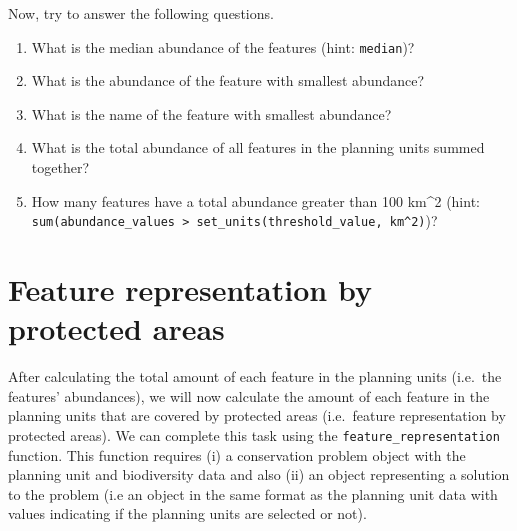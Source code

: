 \documentclass[
  12pt,
]{book}
\makeatletter
\newenvironment{Shaded}{\begin{snugshade}}{\end{snugshade}}
\newcommand{\CommentTok}[1]{\textcolor[rgb]{0.56,0.35,0.01}{\textit{#1}}}
\newcommand{\FunctionTok}[1]{\textcolor[rgb]{0.00,0.00,0.00}{#1}}
\newcommand{\NormalTok}[1]{#1}
\newcommand{\OtherTok}[1]{\textcolor[rgb]{0.56,0.35,0.01}{#1}}
\newcommand{\SpecialCharTok}[1]{\textcolor[rgb]{0.00,0.00,0.00}{#1}}
\newcommand{\StringTok}[1]{\textcolor[rgb]{0.31,0.60,0.02}{#1}}
\providecommand{\tightlist}{%
  \setlength{\itemsep}{0pt}\setlength{\parskip}{0pt}}
\newenvironment{kframe}{%
\medskip{}
\setlength{\fboxsep}{.8em}
 \def\at@end@of@kframe{}%
 \ifinner\ifhmode%
  \def\at@end@of@kframe{\end{minipage}}%
  \begin{minipage}{\columnwidth}%
 \fi\fi%
 \def\FrameCommand##1{\hskip\@totalleftmargin \hskip-\fboxsep
 \colorbox{shadecolor}{##1}\hskip-\fboxsep
     \hskip-\linewidth \hskip-\@totalleftmargin \hskip\columnwidth}%
 \MakeFramed {\advance\hsize-\width
   \@totalleftmargin\z@ \linewidth\hsize
   \@setminipage}}%
 {\par\unskip\endMakeFramed%
 \at@end@of@kframe}
\newenvironment{rmdblock}[1]
  {
  \begin{itemize}
  \renewcommand{\labelitemi}{
    \raisebox{-.7\height}[0pt][0pt]{
      {\setkeys{Gin}{width=3em,keepaspectratio}\texttt{[image: images/\#1]}}
    }
  }
  \setlength{\fboxsep}{1em}
  \begin{kframe}
  \item
  }
  {
  \end{kframe}
  \end{itemize}
  }
\newenvironment{rmdquestion}
  {\begin{rmdblock}{question}}
  {\end{rmdblock}}
\makeatother
\begin{document}
Now, try to answer the following questions.

\begin{rmdquestion}
\begin{enumerate}
\def\labelenumi{\arabic{enumi}.}
\tightlist
\item
  What is the median abundance of the features (hint: \texttt{median})?
\item
  What is the abundance of the feature with smallest abundance?
\item
  What is the name of the feature with smallest abundance?
\item
  What is the total abundance of all features in the planning units summed together?
\item
  How many features have a total abundance greater than 100 km\^{}2 (hint: \texttt{sum(abundance\_values\ \textgreater{}\ set\_units(threshold\_value,\ km\^{}2)})?
\end{enumerate}
\end{rmdquestion}

\hypertarget{feature-representation-by-protected-areas}{%
\section{Feature representation by protected areas}\label{feature-representation-by-protected-areas}}

After calculating the total amount of each feature in the planning units (i.e.~the features' abundances), we will now calculate the amount of each feature in the planning units that are covered by protected areas (i.e.~feature representation by protected areas). We can complete this task using the \texttt{feature\_representation} function. This function requires (i) a conservation problem object with the planning unit and biodiversity data and also (ii) an object representing a solution to the problem (i.e an object in the same format as the planning unit data with values indicating if the planning units are selected or not).

\begin{Shaded}
\end{Shaded}
\end{document}
